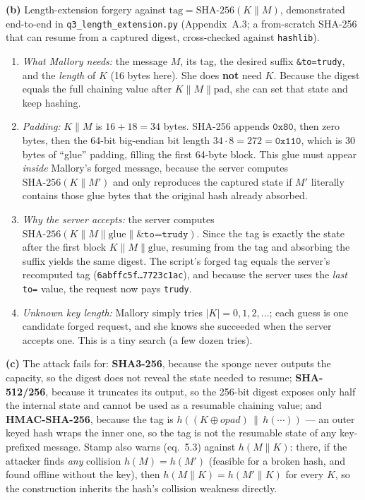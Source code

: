 \documentclass[11pt,a4paper]{article}
\begin{document}
\textbf{(b)} Length-extension forgery against $\mathrm{tag}=\mathrm{SHA\text{-}256}(K\|M)$, demonstrated
end-to-end in \texttt{q3\_length\_extension.py} (Appendix~A.3; a from-scratch SHA-256 that can resume from
a captured digest, cross-checked against \texttt{hashlib}).
\begin{enumerate}[label=(\roman*)]
\item \emph{What Mallory needs:} the message $M$, its tag, the desired suffix \texttt{\&to=trudy}, and the
\emph{length} of $K$ (16 bytes here). She does \textbf{not} need $K$. Because the digest equals the full
chaining value after $K\|M\|\text{pad}$, she can set that state and keep hashing.
\item \emph{Padding:} $K\|M$ is $16+18=34$ bytes. SHA-256 appends $\texttt{0x80}$, then zero bytes, then
the 64-bit big-endian bit length $34\cdot 8 = 272 = \texttt{0x110}$, which is $30$ bytes of ``glue''
padding, filling the first 64-byte block. This glue must appear \emph{inside} Mallory's forged message,
because the server computes $\mathrm{SHA\text{-}256}(K\|M')$ and only reproduces the captured state if
$M'$ literally contains those glue bytes that the original hash already absorbed.
\item \emph{Why the server accepts:} the server computes
$\mathrm{SHA\text{-}256}(K\|M\|\text{glue}\|\texttt{\&to=trudy})$. Since the tag is exactly the state
after the first block $K\|M\|\text{glue}$, resuming from the tag and absorbing the suffix yields the same
digest. The script's forged tag equals the server's recomputed tag
(\texttt{6abffc5f\ldots7723c1ac}), and because the server uses the \emph{last} \texttt{to=} value, the
request now pays \texttt{trudy}.
\item \emph{Unknown key length:} Mallory simply tries $|K|=0,1,2,\dots$; each guess is one candidate
forged request, and she knows she succeeded when the server accepts one. This is a tiny search (a few
dozen tries).
\end{enumerate}

\textbf{(c)} The attack fails for: \textbf{SHA3-256}, because the sponge never outputs the capacity, so
the digest does not reveal the state needed to resume; \textbf{SHA-512/256}, because it truncates its
output, so the 256-bit digest exposes only half the internal state and cannot be used as a resumable
chaining value; and \textbf{HMAC-SHA-256}, because the tag is $h((K\oplus opad)\,\|\,h(\cdots))$ --- an
outer keyed hash wraps the inner one, so the tag is not the resumable state of any key-prefixed message.
Stamp also warns (eq.~5.3) against $h(M\|K)$: there, if the attacker finds \emph{any} collision
$h(M)=h(M')$ (feasible for a broken hash, and found offline without the key), then
$h(M\|K)=h(M'\|K)$ for every $K$, so the construction inherits the hash's collision weakness directly.
\end{document}
